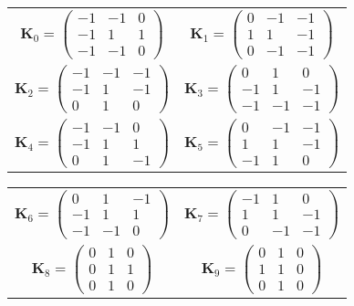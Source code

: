 \documentclass{somasmsc}
\begin{document}
\begin{center}
\begin{tabular}{c c}
    $\mathbf{K}_0 =
    \begin{pmatrix}
        -1 & -1 & 0 \\
        -1 &  1 & 1 \\
        -1 & -1 & 0
    \end{pmatrix}$ &
    $\mathbf{K}_1 =
    \begin{pmatrix}
         0 & -1 & -1 \\
         1 &  1 & -1 \\
         0 & -1 & -1
    \end{pmatrix}$ \\
    $\mathbf{K}_2 =
    \begin{pmatrix}
        -1 & -1 & -1 \\
        -1 &  1 & -1 \\
         0 &  1 &  0
    \end{pmatrix}$ &
    $\mathbf{K}_3 =
    \begin{pmatrix}
         0 &  1 &  0 \\
        -1 &  1 & -1 \\
        -1 & -1 & -1
    \end{pmatrix}$ \\
    $\mathbf{K}_4 =
    \begin{pmatrix}
        -1 & -1 &  0 \\
        -1 &  1 &  1 \\
         0 &  1 & -1
    \end{pmatrix}$ &
    $\mathbf{K}_5 =
    \begin{pmatrix}
         0 & -1 & -1 \\
         1 &  1 & -1 \\
        -1 &  1 &  0
    \end{pmatrix}$
\end{tabular}
\begin{tabular}{c c}
    $\mathbf{K}_6 =
    \begin{pmatrix}
         0 &  1 & -1 \\
        -1 &  1 &  1 \\
        -1 & -1 &  0
    \end{pmatrix}$ &
    $\mathbf{K}_7 =
    \begin{pmatrix}
        -1 &  1 &  0 \\
         1 &  1 & -1 \\
         0 & -1 & -1
    \end{pmatrix}$ \\
    $\mathbf{K}_8 =
    \begin{pmatrix}
        0 & 1 & 0 \\
        0 & 1 & 1 \\
        0 & 1 & 0
    \end{pmatrix}$ &
    $\mathbf{K}_9 =
    \begin{pmatrix}
        0 & 1 & 0 \\
        1 & 1 & 0 \\
        0 & 1 & 0
    \end{pmatrix}$
\end{tabular}
\end{center}
\end{document}

